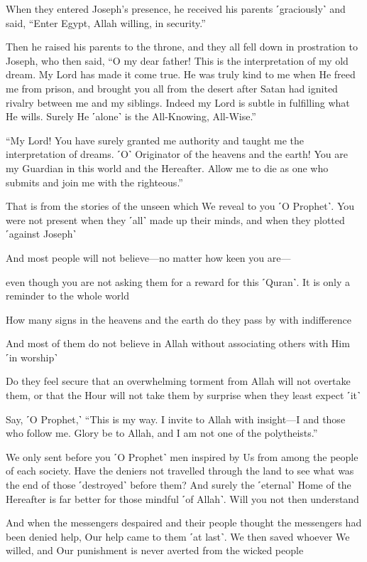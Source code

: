 When they entered Joseph’s presence, he received his parents ˹graciously˺ and said, “Enter Egypt, Allah willing, in security.”

Then he raised his parents to the throne, and they all fell down in prostration to Joseph, who then said, “O my dear father! This is the interpretation of my old dream. My Lord has made it come true. He was truly kind to me when He freed me from prison, and brought you all from the desert after Satan had ignited rivalry between me and my siblings. Indeed my Lord is subtle in fulfilling what He wills. Surely He ˹alone˺ is the All-Knowing, All-Wise.”

“My Lord! You have surely granted me authority and taught me the interpretation of dreams. ˹O˺ Originator of the heavens and the earth! You are my Guardian in this world and the Hereafter. Allow me to die as one who submits and join me with the righteous.”

That is from the stories of the unseen which We reveal to you ˹O Prophet˺. You were not present when they ˹all˺ made up their minds, and when they plotted ˹against Joseph˺

And most people will not believe—no matter how keen you are—

even though you are not asking them for a reward for this ˹Quran˺. It is only a reminder to the whole world

How many signs in the heavens and the earth do they pass by with indifference

And most of them do not believe in Allah without associating others with Him ˹in worship˺

Do they feel secure that an overwhelming torment from Allah will not overtake them, or that the Hour will not take them by surprise when they least expect ˹it˺

Say, ˹O Prophet,˺ “This is my way. I invite to Allah with insight—I and those who follow me. Glory be to Allah, and I am not one of the polytheists.”

We only sent before you ˹O Prophet˺ men inspired by Us from among the people of each society. Have the deniers not travelled through the land to see what was the end of those ˹destroyed˺ before them? And surely the ˹eternal˺ Home of the Hereafter is far better for those mindful ˹of Allah˺. Will you not then understand

And when the messengers despaired and their people thought the messengers had been denied help, Our help came to them ˹at last˺. We then saved whoever We willed, and Our punishment is never averted from the wicked people

